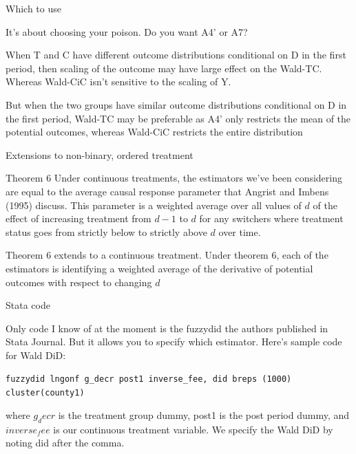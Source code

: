 \documentclass{beamer}
\begin{document}
\begin{frame}{Which to use}

It's about choosing your poison.  Do you want A4' or A7? 

\bigskip

When T and C have different outcome distributions conditional on D in the first period, then scaling of the outcome may have large effect on the Wald-TC.  Whereas Wald-CiC isn't sensitive to the scaling of Y.

\bigskip

But when the two groups have similar outcome distributions conditional on D in the first period, Wald-TC may be preferable as A4' only restricts the mean of the potential outcomes, whereas Wald-CiC restricts the entire distribution

\end{frame}

\begin{frame}{Extensions to non-binary, ordered treatment}

\begin{block}{Theorem 6}
Under continuous treatments, the estimators we've been considering are equal to the average causal response parameter that Angrist and Imbens (1995) discuss.  This parameter is a weighted average over all values of $d$ of the effect of increasing treatment from $d-1$ to $d$ for any switchers where treatment status goes from strictly below to strictly above $d$ over time.
\end{block}

Theorem 6 extends to a continuous treatment.  Under theorem 6, each of the estimators is identifying a weighted average of the derivative of potential outcomes with respect to changing $d$

\end{frame}

\begin{frame}{Stata code}

Only code I know of at the moment is the fuzzydid the authors published in Stata Journal.  But it allows you to specify which estimator.  Here's sample code for Wald DiD:

\bigskip

\texttt{fuzzydid lngonf g_decr post1 inverse_fee, did breps (1000) cluster(county1)}

where $g_decr$ is the treatment group dummy, post1 is the post period dummy, and $inverse_fee$ is our continuous treatment variable. We specify the Wald DiD by noting did after the comma.

\end{frame}
\end{document}
